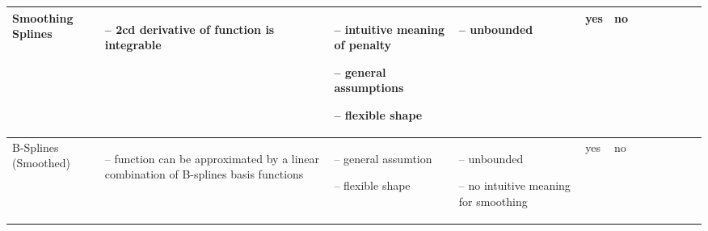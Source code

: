\begin{table}[!ht]
\begin{tabular}{p{1.6cm}p{3.3cm}p{3.3cm}p{3.4cm}p{0.4cm}p{0.4cm}p{3cm}p{3cm}p{3cm}p{3cm}p{3cm}p{3cm}|}
		Smoothing Splines                                                                                                                                            &
		\begin{cptitemize} \item[--]  2cd derivative of function is integrable                                                        \end{cptitemize}               &
		\begin{cptitemize} \item[--]  intuitive meaning of penalty \item[--]  general assumptions \item[--]  flexible shape                         \end{cptitemize} &
		\begin{cptitemize} \item[--]  unbounded                                                                                       \end{cptitemize}               &
		yes                                                                                                                                                          &
		no                                                                                                                                                             \\ \hline%

		B-Splines (Smoothed)                                                                                                                                         &
		\begin{cptitemize} \item[--]  function can be approximated by a linear combination of B-splines basis functions               \end{cptitemize}               &
		\begin{cptitemize} \item[--]  general assumtion \item[--]  flexible shape                                                            \end{cptitemize}        &
		\begin{cptitemize} \item[--]  unbounded \item[--]  no intuitive meaning for smoothing                                                \end{cptitemize}        &
		yes                                                                                                                                                            &
		no                                                                                                                                                             \\ \hline%


\end{tabular}
\end{table}
